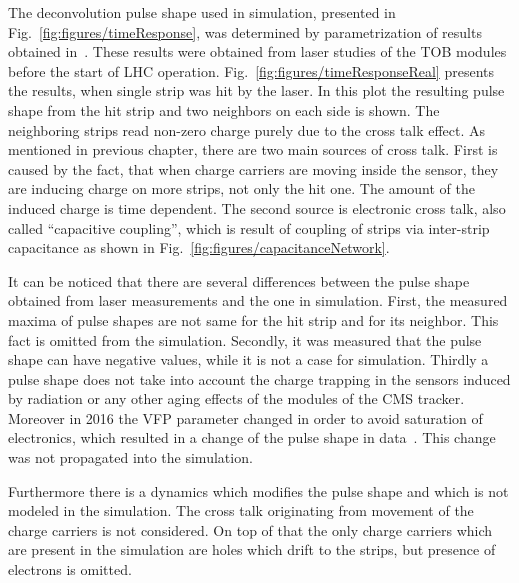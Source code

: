 The deconvolution pulse shape used in simulation, presented in Fig.~\ref{fig:figures/timeResponse}, was determined by parametrization of results obtained in~\cite{Delaere:1061284}. These results were obtained from laser studies of the TOB modules before the start of LHC operation. Fig.~\ref{fig:figures/timeResponseReal} presents the results, when single strip was hit by the laser. In this plot the resulting pulse shape from the hit strip and two neighbors on each side is shown. The neighboring strips read non-zero charge purely due to the cross talk effect. As mentioned in previous chapter, there are two main sources of cross talk. First is caused by the fact, that when charge carriers are moving inside the sensor, they are inducing charge on more strips, not only the hit one. The amount of the induced charge is time dependent. The second source is electronic cross talk, also called ``capacitive coupling'', which is result of coupling of strips via inter-strip capacitance as shown in Fig.~\ref{fig:figures/capacitanceNetwork}. 


It can be noticed that there are several differences between the pulse shape obtained from laser measurements and the one in simulation. First, the measured maxima of pulse shapes are not same for the hit strip and for its neighbor. This fact is omitted from the simulation. Secondly, it was measured that the pulse shape can have negative values, while it is not a case for simulation. Thirdly a pulse shape does not take into account the charge trapping in the sensors induced by radiation or any other aging effects of the modules of the CMS tracker. Moreover in 2016 the VFP parameter changed in order to avoid saturation of electronics, which resulted in a change of the pulse shape in data~\cite{website:vfp}. This change was not propagated into the simulation.

Furthermore there is a dynamics which modifies the pulse shape and which is not modeled in the simulation. The cross talk originating from movement of the charge carriers is not considered. On top of that the only charge carriers which are present in the simulation are holes which drift to the strips, but presence of electrons is omitted.


